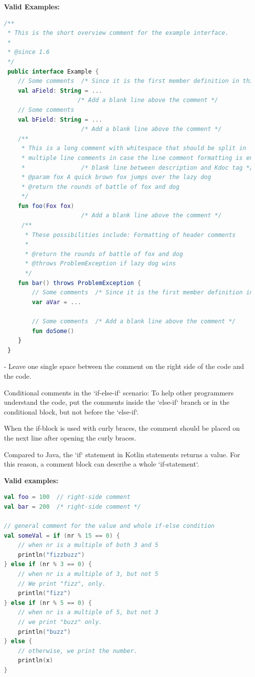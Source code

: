 \textbf{Valid Examples:}

\begin{lstlisting}[language=Kotlin]
/**
 * This is the short overview comment for the example interface.
 *
 * @since 1.6
 */
 public interface Example {
    // Some comments  /* Since it is the first member definition in this code block, there is no need to add a blank line here */
    val aField: String = ...
                     /* Add a blank line above the comment */
    // Some comments
    val bField: String = ...
                      /* Add a blank line above the comment */
    /**
     * This is a long comment with whitespace that should be split in
     * multiple line comments in case the line comment formatting is enabled.
     *                /* blank line between description and Kdoc tag */
     * @param fox A quick brown fox jumps over the lazy dog
     * @return the rounds of battle of fox and dog
     */
    fun foo(Fox fox)
                      /* Add a blank line above the comment */
     /**
      * These possibilities include: Formatting of header comments
      *
      * @return the rounds of battle of fox and dog
      * @throws ProblemException if lazy dog wins
      */
    fun bar() throws ProblemException {
        // Some comments  /* Since it is the first member definition in this range, there is no need to add a blank line here */
        var aVar = ...

        // Some comments  /* Add a blank line above the comment */
        fun doSome()
    }
 }
\end{lstlisting}


- Leave one single space between the comment on the right side of the code and the code.

Conditional comments in the `if-else-if` scenario: To help other programmers understand the code, put the comments inside the `else-if` branch or in the conditional block, but not before the `else-if`.

When the if-block is used with curly braces, the comment should be placed on the next line after opening the curly braces.

Compared to Java, the `if` statement in Kotlin statements returns a value. For this reason, a comment block can describe a whole `if-statement`.



\textbf{Valid examples:}



\begin{lstlisting}[language=Kotlin]
val foo = 100  // right-side comment
val bar = 200  /* right-side comment */

// general comment for the value and whole if-else condition
val someVal = if (nr % 15 == 0) {
    // when nr is a multiple of both 3 and 5
    println("fizzbuzz")
} else if (nr % 3 == 0) {
    // when nr is a multiple of 3, but not 5
    // We print "fizz", only.
    println("fizz")
} else if (nr % 5 == 0) {
    // when nr is a multiple of 5, but not 3
    // we print "buzz" only.
    println("buzz")
} else {
    // otherwise, we print the number.
    println(x)
}
\end{lstlisting}


